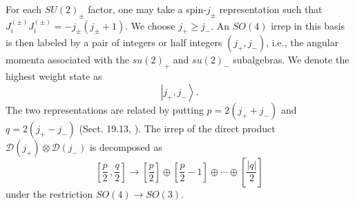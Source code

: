 \documentclass[12pt,epsf]{article}
\begin{document}
For each $SU(2)_\pm$ factor, one may take a spin-$j_\pm$ representation such that $J^{(\pm)}_i J^{(\pm)}_i = - j_\pm (j_\pm +1)$.
We choose $j_+ \geq j_-$.
An $SO(4)$ irrep in this basis is then labeled by a pair of integers or half integers $(j_+, j_-)$, i.e.,
the angular momenta associated with the $su(2)_+$ and $su(2)_-$ subalgebras.
We denote the highest weight state as
\begin{equation}\label{high-w-pq}
  \left|j_+, j_- \right\rangle.
\end{equation}
The two representations are related by putting $p = 2 (j_+ + j_-)$ and $q = 2(j_+ - j_-)$ (Sect. 19.13, \cite{book-wybo}).
The irrep of the direct product $\mathcal{D}(j_+) \otimes \mathcal{D}(j_-)$
is decomposed as
\begin{equation}\label{so-irrep}
  \left[\frac{p}{2}\,, \frac{q}{2} \right] \to \left[\frac{p}{2} \right] \oplus
  \left[\frac{p}{2} - 1 \right] \oplus \cdots \oplus \left[\frac{|q|}{2} \right]
\end{equation}
under the restriction $SO(4) \to SO(3)$.
\end{document}
